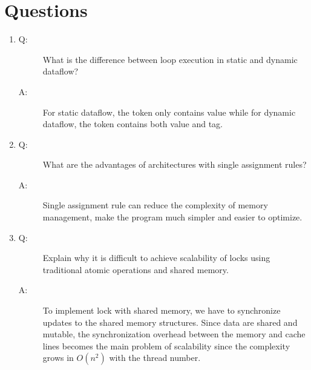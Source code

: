 \documentclass[12pt]{article}
\begin{document}
\section{Questions}
\begin{enumerate}
\item
\begin{description}
\item[Q: ] What is the difference between loop execution in static and 
dynamic dataflow?
\item[A: ] For static dataflow, the token only contains value while for 
dynamic dataflow, the token contains both value and tag.
\end{description}

\item
\begin{description}
\item[Q: ] What are the advantages of architectures with single 
assignment rules?
\item[A: ] Single assignment rule can reduce the complexity of memory
management, make the program much simpler and easier to optimize.
\end{description}

\item
\begin{description}
\item[Q: ] Explain why it is difficult to achieve scalability of 
locks using traditional atomic operations and shared memory.
\item[A: ] To implement lock with shared memory, we have to 
synchronize updates to the shared memory structures. Since data
are shared and mutable, the synchronization overhead between the 
memory and cache lines becomes the main problem of scalability since
the complexity grows in $O(n^{2})$ with the thread number.

\end{description}

\end{enumerate}
\end{document}
